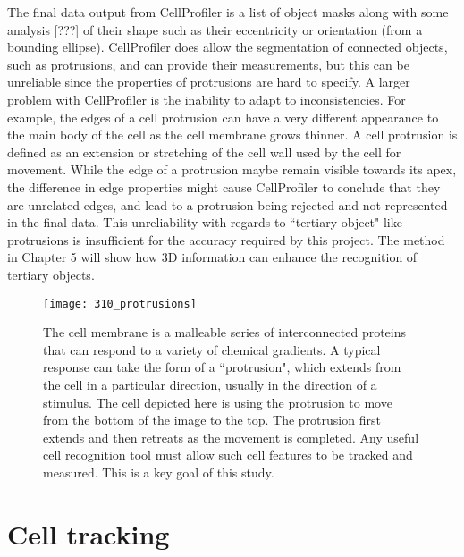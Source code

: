 The final data output from CellProfiler is a list of object masks along with some analysis [???] of their shape such as their eccentricity or orientation (from a bounding ellipse). CellProfiler does allow the segmentation of connected objects, such as protrusions, and can provide their measurements, but this can be unreliable since the properties of protrusions are hard to specify. A larger problem with CellProfiler is the inability to adapt to inconsistencies. For example, the edges of a cell protrusion can have a very different appearance to the main body of the cell as the cell membrane grows thinner. A cell protrusion is defined as an extension or stretching of the cell wall used by the cell for movement. While the edge of a protrusion maybe remain visible towards its apex, the difference in edge properties might cause CellProfiler to conclude that they are unrelated edges, and lead to a protrusion being rejected and not represented in the final data. This unreliability with regards to ``tertiary object" like protrusions is insufficient for the accuracy required by this project. The method in Chapter 5 will show how 3D information can enhance the recognition of tertiary objects.

\begin{figure}[h!]
 \centering
 \texttt{[image: 310\_protrusions]}
 \caption[Cell protrusion example]{
 	The cell membrane is a malleable series of interconnected proteins that can respond to a variety of chemical gradients. A typical response can take the form of a ``protrusion", which extends from the cell in a particular direction, usually in the direction of a stimulus. The cell depicted here is using the protrusion to move from the bottom of the image to the top. The protrusion first extends and then retreats as the movement is completed. Any useful cell recognition tool must allow such cell features to be tracked and measured. This is a key goal of this study.
 }
 \label{fig:cellprotrusions}
\end{figure}

\section{Cell tracking}

